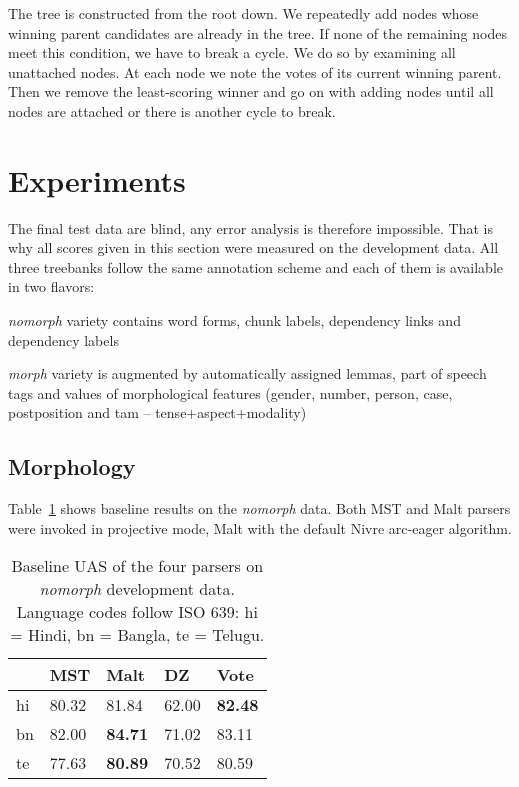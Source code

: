\documentclass[11pt]{article}
\def\Tref#1{Table~\ref{#1}}
\begin{document}
The tree is constructed from the root down. We repeatedly add nodes whose winning parent candidates are already in the tree. If none of the remaining nodes meet this condition, we have to break a cycle. We do so by examining all unattached nodes. At each node we note the votes of its current winning parent. Then we remove the least-scoring winner and go on with adding nodes until all nodes are attached or there is another cycle to break.

\section{Experiments}
\label{sec:experiments}

The final test data are blind, any error analysis is therefore impossible. That is why all scores given in this section were measured on the development data. All three treebanks follow the same annotation scheme and each of them is available in two flavors:

\begin{compactitem}
\item \textit{nomorph} variety contains word forms, chunk labels, dependency links and dependency labels
\item \textit{morph} variety is augmented by automatically assigned lemmas, part of speech tags and values of morphological features (gender, number, person, case, postposition and tam -- tense+aspect+modality)
\end{compactitem}

\subsection{Morphology}
\label{sec:morphology}

\Tref{tab:baseline} shows baseline results on the \textit{nomorph} data. Both MST and Malt parsers were invoked in projective mode, Malt with the default Nivre arc-eager algorithm.

\begin{table}[ht]
\begin{centering}
\begin{tabular}{l|l|l|l|l}
& \textbf{MST} & \textbf{Malt} & \textbf{DZ} & \textbf{Vote} \\
\hline
hi & 80.32 & 81.84 & 62.00 & \textbf{82.48}\\
bn & 82.00 & \textbf{84.71} & 71.02 & 83.11\\
te & 77.63 & \textbf{80.89} & 70.52 & 80.59\\
\end{tabular}
\caption{Baseline UAS of the four parsers on \textit{nomorph} development data. Language codes follow ISO 639: hi = Hindi, bn = Bangla, te = Telugu.}
\label{tab:baseline}
\end{centering}
\end{table}
\end{document}
